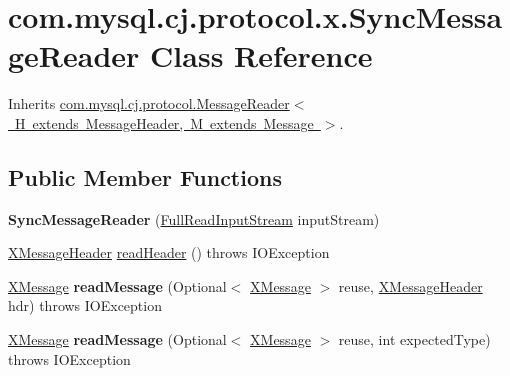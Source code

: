 \hypertarget{classcom_1_1mysql_1_1cj_1_1protocol_1_1x_1_1_sync_message_reader}{}\section{com.\+mysql.\+cj.\+protocol.\+x.\+Sync\+Message\+Reader Class Reference}
\label{classcom_1_1mysql_1_1cj_1_1protocol_1_1x_1_1_sync_message_reader}


Inherits \mbox{\hyperlink{interfacecom_1_1mysql_1_1cj_1_1protocol_1_1_message_reader}{com.\+mysql.\+cj.\+protocol.\+Message\+Reader$<$ H extends Message\+Header, M extends Message $>$}}.

\subsection*{Public Member Functions}
\begin{DoxyCompactItemize}
\item 
\mbox{\label{classcom_1_1mysql_1_1cj_1_1protocol_1_1x_1_1_sync_message_reader_a2464524fa481333d1d350b03f41d14ad}} 
{\bfseries Sync\+Message\+Reader} (\mbox{\hyperlink{classcom_1_1mysql_1_1cj_1_1protocol_1_1_full_read_input_stream}{Full\+Read\+Input\+Stream}} input\+Stream)
\item 
\mbox{\hyperlink{classcom_1_1mysql_1_1cj_1_1protocol_1_1x_1_1_x_message_header}{X\+Message\+Header}} \mbox{\hyperlink{classcom_1_1mysql_1_1cj_1_1protocol_1_1x_1_1_sync_message_reader_a057a4fcddafa78836d874a30205936fc}{read\+Header}} ()  throws I\+O\+Exception 
\item 
\mbox{\label{classcom_1_1mysql_1_1cj_1_1protocol_1_1x_1_1_sync_message_reader_a80429605aa58590c81c645fabf200f1e}} 
\mbox{\hyperlink{classcom_1_1mysql_1_1cj_1_1protocol_1_1x_1_1_x_message}{X\+Message}} {\bfseries read\+Message} (Optional$<$ \mbox{\hyperlink{classcom_1_1mysql_1_1cj_1_1protocol_1_1x_1_1_x_message}{X\+Message}} $>$ reuse, \mbox{\hyperlink{classcom_1_1mysql_1_1cj_1_1protocol_1_1x_1_1_x_message_header}{X\+Message\+Header}} hdr)  throws I\+O\+Exception 
\item 
\mbox{\label{classcom_1_1mysql_1_1cj_1_1protocol_1_1x_1_1_sync_message_reader_a878c3dcae955da43eb45bee60d904e54}} 
\mbox{\hyperlink{classcom_1_1mysql_1_1cj_1_1protocol_1_1x_1_1_x_message}{X\+Message}} {\bfseries read\+Message} (Optional$<$ \mbox{\hyperlink{classcom_1_1mysql_1_1cj_1_1protocol_1_1x_1_1_x_message}{X\+Message}} $>$ reuse, int expected\+Type)  throws I\+O\+Exception 
\end{DoxyCompactItemize}


